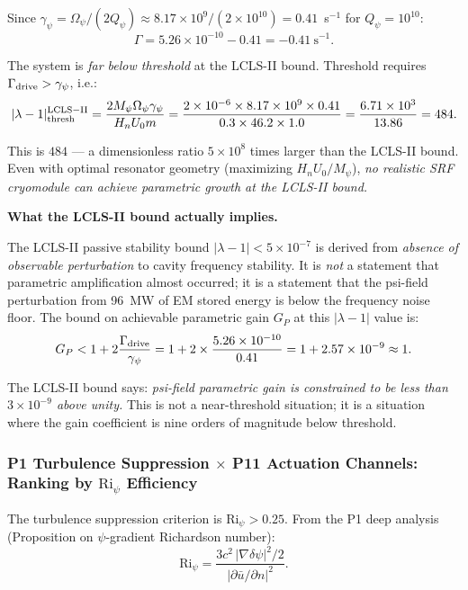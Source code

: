 \documentclass[11pt,twocolumn]{article}
\newcommand{\dpsi}{\delta\psi}
\newcommand{\lam}{\lambda}
\newcommand{\Opsi}{\Omega_\psi}
\newcommand{\gpsi}{\gamma_\psi}
\newcommand{\Mpsi}{M_\psi}
\newcommand{\Ri}{\mathrm{Ri}}
\begin{document}
Since $\gpsi = \Opsi/(2Q_\psi) \approx 8.17\times10^9/(2\times10^{10})
= 0.41$~s$^{-1}$ for $Q_\psi = 10^{10}$:
\begin{equation}
\Gamma = 5.26\times10^{-10} - 0.41 = -0.41~\text{s}^{-1}.
\label{eq:gamma_net}
\end{equation}

The system is \emph{far below threshold} at the LCLS-II bound.
Threshold requires $\Gamma_{\rm drive} > \gpsi$, i.e.:
\begin{equation}
|\lam-1|_{\rm thresh}^{\rm LCLS-II} = \frac{2\Mpsi\Opsi\gpsi}{H_n U_0 m}
= \frac{2\times10^{-6}\times8.17\times10^9\times 0.41}
{0.3\times46.2\times1.0}
= \frac{6.71\times10^3}{13.86}
= 484.
\label{eq:lambda_thresh_lcls}
\end{equation}

This is $484$ --- a dimensionless ratio $5\times10^8$ times larger than
the LCLS-II bound. Even with optimal resonator geometry (maximizing $H_n U_0/\Mpsi$),
\emph{no realistic SRF cryomodule can achieve parametric growth at the
LCLS-II bound.}

\textbf{What the LCLS-II bound actually implies.}

The LCLS-II passive stability bound $|\lam-1| < 5\times10^{-7}$ is derived
from \emph{absence of observable perturbation} to cavity frequency stability.
It is \emph{not} a statement that parametric amplification almost occurred;
it is a statement that the psi-field perturbation from 96~MW of EM stored energy
is below the frequency noise floor. The bound on achievable parametric gain
$G_P$ at this $|\lam-1|$ value is:
\begin{equation}
G_P < 1 + 2\frac{\Gamma_{\rm drive}}{\gpsi}
= 1 + 2\times\frac{5.26\times10^{-10}}{0.41}
= 1 + 2.57\times10^{-9} \approx 1.
\label{eq:gp_bound}
\end{equation}

The LCLS-II bound says: \emph{psi-field parametric gain is constrained to
be less than $3\times10^{-9}$ above unity.} This is not a near-threshold
situation; it is a situation where the gain coefficient is nine orders
of magnitude below threshold.

\subsubsection{P1 Turbulence Suppression $\times$ P11 Actuation Channels:
  Ranking by $\Ri_\psi$ Efficiency}
\label{sec:p1_p11}

The turbulence suppression criterion is $\Ri_\psi > 0.25$. From the
P1 deep analysis (Proposition on $\psi$-gradient Richardson number):
\begin{equation}
\Ri_\psi = \frac{3c^2\,|\nabla\dpsi|^2/2}{|\partial\bar{u}/\partial n|^2}.
\label{eq:ri_psi}
\end{equation}
\end{document}
